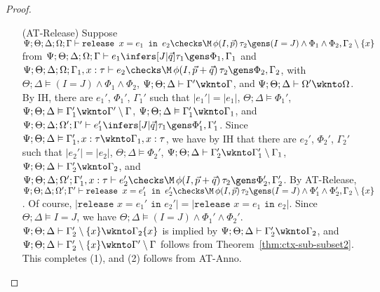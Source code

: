 \begin{proof}
\begin{itemize}
  \item[(AT-Release)] Suppose
  $\Psi ; \Theta ; \Delta ; \Omega ; \Gamma \vdash \texttt{release } x = e_1 \texttt{ in }e_2 \checks \M \, \phi(I,\vec{p}) \, \tau_2 \gens (I = J) \wedge \Phi_1 \wedge \Phi_2, \Gamma_2 \setminus \{x\}$ from
  $\Psi ; \Theta ; \Delta ; \Omega ; \Gamma \vdash e_1 \infers [J | \vec{q}] \tau_1 \gens \Phi_1,\Gamma_1$ and
  $\Psi ; \Theta ; \Delta ; \Omega ; \Gamma_1, x : \tau \vdash e_2 \checks \M \, \phi(I,\vec{p} + \vec{q}) \, \tau_2 \gens \Phi_2, \Gamma_2$, with
  $\Theta ; \Delta \vDash (I = J) \wedge \Phi_1 \wedge \Phi_2$,
  $\Psi ; \Theta ; \Delta \vdash \Gamma' \wknto \Gamma$, and
  $\Psi ; \Theta ; \Delta \vdash \Omega' \wknto \Omega$.
  By IH, there are $e_1'$, $\Phi_1'$, $\Gamma_1'$ such that
  $|e_1'| = |e_1|$,
  $\Theta ; \Delta \vDash \Phi_1'$,
  $\Psi ; \Theta ; \Delta \vDash \Gamma_1' \wknto \Gamma' \setminus \Gamma$,
  $\Psi ; \Theta ; \Delta \vDash \Gamma_1' \wknto \Gamma_1$, and
  $\Psi ; \Theta ; \Delta ; \Omega' ; \Gamma' \vdash e_1' \infers [J|\vec{q}] \tau_1 \gens \Phi_1',\Gamma_1'$.
  Since $\Psi ; \Theta ; \Delta \vDash \Gamma_1', x : \tau \wknto \Gamma_1, x : \tau$, we have
  by IH that there are $e_2'$, $\Phi_2'$, $\Gamma_2'$ such that
  $|e_2'| = |e_2|$,
  $\Theta ; \Delta \vDash \Phi_2'$,
  $\Psi ; \Theta ; \Delta \vdash \Gamma_2' \wknto \Gamma_1' \setminus \Gamma_1$,
  $\Psi ; \Theta ; \Delta \vdash \Gamma_2' \wknto \Gamma_2$, and
  $\Psi ; \Theta ; \Delta ; \Omega' ; \Gamma_1', x : \tau \vdash e_2' \checks \M \, \phi(I,\vec{p} + \vec{q}) \, \tau_2 \gens \Phi_2',\Gamma_2'$.
  By AT-Release,
  $\Psi ; \Theta ; \Delta ; \Omega' ; \Gamma' \vdash \texttt{release } x = e_1' \texttt{ in }e_2' \checks \M \, \phi(I,\vec{p}) \, \tau_2 \gens (I = J) \wedge \Phi_1' \wedge \Phi_2', \Gamma_2 \setminus \{x\}$.
  Of course, $|\texttt{release } x = e_1' \texttt{ in }e_2'| = |\texttt{release } x = e_1 \texttt{ in }e_2|$.
  Since $\Theta ; \Delta \vDash I = J$, we have $\Theta ; \Delta \vDash (I = J) \wedge \Phi_1' \wedge \Phi_2'$.
  $\Psi ; \Theta ; \Delta \vdash \Gamma_2' \setminus \{x\} \wknto \Gamma_2 \{x\}$ is implied by $\Psi ; \Theta ; \Delta \vdash \Gamma_2' \wknto \Gamma_2$,
  and $\Psi ; \Theta ; \Delta \vdash \Gamma_2' \setminus \{x\} \wknto \Gamma' \setminus \Gamma$ follows from Theorem~\ref{thm:ctx-sub-subset2}. This completes (1), and (2) follows from AT-Anno.
  

\end{itemize}
\end{proof}
